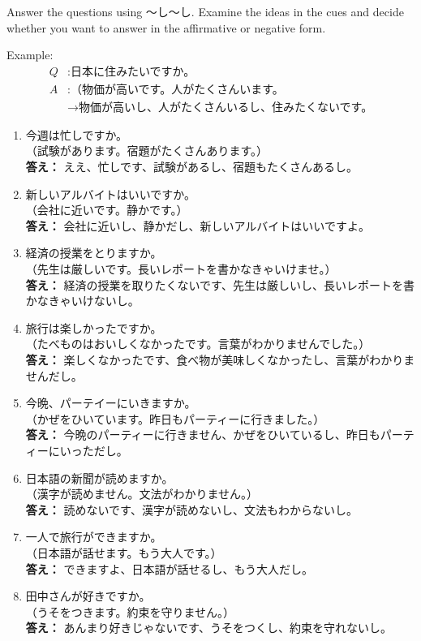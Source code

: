\documentclass[notoc,notitlepage]{tufte-book}
\begin{document}
\begin{ex}

  Answer the questions using 〜し〜し. Examine the ideas in the cues and decide whether you want to answer in the affirmative or negative form.

  Example:
  \begin{align*}
    Q &: \text{日本に住みたいですか。} \\
    A &: \text{（物価が高いです。人がたくさんいます。} \\
      &\to \text{物価が高いし、人がたくさんいるし、住みたくないです。}
  \end{align*}

  \begin{enumerate}
    \item 今週は忙しですか。\\
      （試験があります。宿題がたくさんあります。）\\
      \textbf{答え：} ええ、忙しです、試験があるし、宿題もたくさんあるし。
    \item 新しいアルバイトはいいですか。\\
      （会社に近いです。静かです。）\\
      \textbf{答え：} 会社に近いし、静かだし、新しいアルバイトはいいですよ。
    \item 経済の授業をとりますか。\\
      （先生は厳しいです。長いレポートを書かなきゃいけませ。）\\
      \textbf{答え：} 経済の授業を取りたくないです、先生は厳しいし、長いレポートを書かなきゃいけないし。
    \item 旅行は楽しかったですか。\\
      （たべものはおいしくなかったです。言葉がわかりませんでした。）\\
      \textbf{答え：} 楽しくなかったです、食べ物が美味しくなかったし、言葉がわかりませんだし。
    \item 今晩、パーテイーにいきますか。\\
      （かぜをひいています。昨日もパーティーに行きました。）\\
      \textbf{答え：} 今晩のパーティーに行きません、かぜをひいているし、昨日もパーティーにいっただし。
    \item 日本語の新聞が読めますか。\\
      （漢字が読めません。文法がわかりません。）\\
      \textbf{答え：} 読めないです、漢字が読めないし、文法もわからないし。
    \item 一人で旅行ができますか。\\
      （日本語が話せます。もう大人です。）\\
      \textbf{答え：} できますよ、日本語が話せるし、もう大人だし。
    \item 田中さんが好きですか。\\
      （うそをつきます。約束を守りません。）\\
      \textbf{答え：} あんまり好きじゃないです、うそをつくし、約束を守れないし。
  \end{enumerate}
\end{ex}
\end{document}
